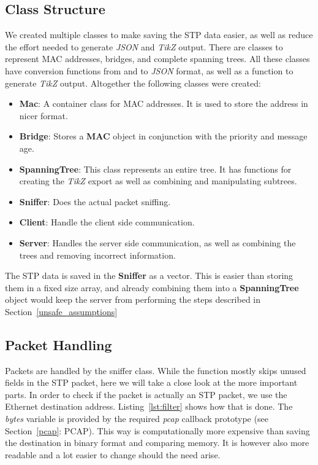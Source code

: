 \subsection{Class Structure}
\label{data}
We created multiple classes to make saving the STP data easier, as well as reduce the effort needed to generate \textit{JSON} and \textit{TikZ} output.
There are classes to represent MAC addresses, bridges, and complete spanning trees.
All these classes have conversion functions from and to \textit{JSON} format, as well as a function to generate \textit{TikZ} output.
Altogether the following classes were created:
\begin{itemize}
    \item \textbf{Mac}: A container class for MAC addresses.
        It is used to store the address in nicer format.
    \item \textbf{Bridge}: Stores a \textbf{MAC} object in conjunction with the priority and message age.
    \item \textbf{SpanningTree}: This class represents an entire tree.
        It has functions for creating the \textit{TikZ} export as well as combining and manipulating subtrees.
    \item \textbf{Sniffer}: Does the actual packet sniffing.
    \item \textbf{Client}: Handle the client side communication.
    \item \textbf{Server}: Handles the server side communication, as well as combining the trees and removing incorrect information.
\end{itemize}
The STP data is saved in the \textbf{Sniffer} as a vector.
This is easier than storing them in a fixed size array, and already combining them into a \textbf{SpanningTree} object would keep the server from performing the steps described in Section~\ref{unsafe_assumptions}

\subsection{Packet Handling}
\label{packet_handling}
Packets are handled by the sniffer class.
While the function mostly skips unused fields in the STP packet, here we will take a close look at the more important parts.
In order to check if the packet is actually an STP packet, we use the Ethernet destination address.
Listing~\ref{lst:filter} shows how that is done.
The \textit{bytes} variable is provided by the required \textit{pcap} callback prototype (see Section~\ref{pcap}: PCAP).
This way is computationally more expensive than saving the destination in binary format and comparing memory.
It is however also more readable and a lot easier to change should the need arise.



